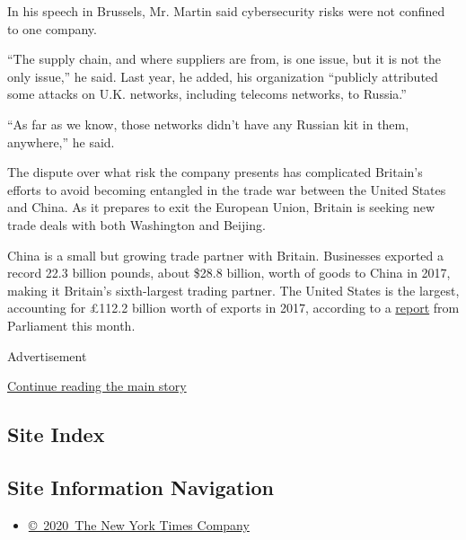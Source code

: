 In his speech in Brussels, Mr. Martin said cybersecurity risks were not
confined to one company.

``The supply chain, and where suppliers are from, is one issue, but it
is not the only issue,'' he said. Last year, he added, his organization
``publicly attributed some attacks on U.K. networks, including telecoms
networks, to Russia.''

``As far as we know, those networks didn't have any Russian kit in them,
anywhere,'' he said.

The dispute over what risk the company presents has complicated
Britain's efforts to avoid becoming entangled in the trade war between
the United States and China. As it prepares to exit the European Union,
Britain is seeking new trade deals with both Washington and Beijing.

China is a small but growing trade partner with Britain. Businesses
exported a record 22.3 billion pounds, about \$28.8 billion, worth of
goods to China in 2017, making it Britain's sixth-largest trading
partner. The United States is the largest, accounting for £112.2 billion
worth of exports in 2017, according to a
\href{https://researchbriefings.parliament.uk/ResearchBriefing/Summary/CBP-7379}{report}
from Parliament this month.

Advertisement

\protect\hyperlink{after-bottom}{Continue reading the main story}

\hypertarget{site-index}{%
\subsection{Site Index}\label{site-index}}

\hypertarget{site-information-navigation}{%
\subsection{Site Information
Navigation}\label{site-information-navigation}}

\begin{itemize}
\tightlist
\item
  \href{https://help.nytimes.com/hc/en-us/articles/115014792127-Copyright-notice}{©~2020~The
  New York Times Company}
\end{itemize}

